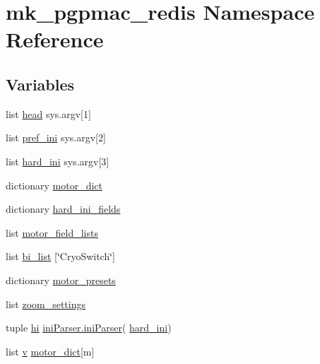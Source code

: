 \hypertarget{namespacemk__pgpmac__redis}{\section{mk\-\_\-pgpmac\-\_\-redis Namespace Reference}
\label{namespacemk__pgpmac__redis}
}
\subsection*{Variables}
\begin{DoxyCompactItemize}
\item 
list \hyperlink{namespacemk__pgpmac__redis_a760ff4955cbf5beef4ae36a28c30b01a}{head} sys.\-argv\mbox{[}1\mbox{]}
\item 
list \hyperlink{namespacemk__pgpmac__redis_a38c785af5201403976e1267c47ea5096}{pref\-\_\-ini} sys.\-argv\mbox{[}2\mbox{]}
\item 
list \hyperlink{namespacemk__pgpmac__redis_a5864d9c27cbe61534756880cbfebe4f1}{hard\-\_\-ini} sys.\-argv\mbox{[}3\mbox{]}
\item 
dictionary \hyperlink{namespacemk__pgpmac__redis_ad8583d4fe88c4c98af73d2858c51c660}{motor\-\_\-dict}
\item 
dictionary \hyperlink{namespacemk__pgpmac__redis_a8257226983aee079ec66f5cc67e194ec}{hard\-\_\-ini\-\_\-fields}
\item 
list \hyperlink{namespacemk__pgpmac__redis_a7228dc1b6ecec376538db1efe8c05ffb}{motor\-\_\-field\-\_\-lists}
\item 
list \hyperlink{namespacemk__pgpmac__redis_a961bfabfbdcbf5b749f6e6ecdc733619}{bi\-\_\-list} \mbox{[}\char`\"{}Cryo\-Switch\char`\"{}\mbox{]}
\item 
dictionary \hyperlink{namespacemk__pgpmac__redis_a2a04d8d0b7270384d1fac674c29e774a}{motor\-\_\-presets}
\item 
list \hyperlink{namespacemk__pgpmac__redis_ad91bac9be746f99e1cf1f8e28ff348be}{zoom\-\_\-settings}
\item 
tuple \hyperlink{namespacemk__pgpmac__redis_af0e472a4df25fc5c1660ef07226689a8}{hi} \hyperlink{classiniParser_1_1iniParser}{ini\-Parser.\-ini\-Parser}( \hyperlink{namespacemk__pgpmac__redis_a5864d9c27cbe61534756880cbfebe4f1}{hard\-\_\-ini})
\item 
list \hyperlink{namespacemk__pgpmac__redis_ac732d49b0afca9a9951e3a252bae42fc}{v} \hyperlink{namespacemk__pgpmac__redis_ad8583d4fe88c4c98af73d2858c51c660}{motor\-\_\-dict}\mbox{[}m\mbox{]}
\item 

\end{DoxyCompactItemize}
